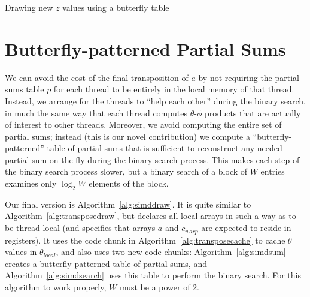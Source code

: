 \documentclass[10pt,nohyperref]{sigplanconf}
\newcommand*\Assign[2]{\State #1 $\gets$ #2}
\newcommand*\LocalArray[1]{\State {\bf local array} #1}
\newcommand*\RegisterArray[1]{\State {\bf register array} #1}
\newcommand*\Bind[2]{\State {\bf let} #1 $\gets$ #2}
\newcommand*\Var[1]{{\mathit{#1}}}
\newcommand*\Output{\;\mathbf{output}\;}
\newcommand*\ProcTwoX[1]{\State\hbox{\hskip-\algorithmicindent\hskip\wd\proctwobox#1$\bigr)$}}
\newcommand*\UseCodeChunk[1]{\State $\langle${#1}$\rangle$}
\begin{document}
\begin{algorithm}[t]
\caption{Drawing new $z$ values using a butterfly table}\label{alg:simddraw}
\end{algorithm}




\section{Butterfly-patterned Partial Sums}


We can avoid the cost of the final transposition of $a$ by not requiring the partial sums table $p$
for each thread to be entirely in the local memory of that thread.  Instead, we arrange for the
threads to ``help each other'' during the binary search, in much the same way that
each thread computes $\theta$-$\phi$ products that are actually of interest to other threads.
Moreover, we avoid computing the entire set of partial sums; instead (this is our novel contribution) we compute a
``butterfly-patterned'' table of partial sums that is sufficient to reconstruct any
needed partial sum on the fly during the binary search process.  This makes each step of
the binary search process slower, but a binary search
of a block of $W$ entries examines only $\log_2 W$ elements of the block.

Our final version is Algorithm~\ref{alg:simddraw}.  It is quite similar to Algorithm~\ref{alg:transposedraw},
but declares all local arrays in such a way as to be thread-local (and specifies that arrays $a$ and $c_{\mathit{warp}}$
are expected to reside in registers).  It uses the code chunk in Algorithm~\ref{alg:transposecache}
to cache $\theta$ values in $\theta_{\mathit{local}}$, and also uses two new code chunks:
Algorithm~\ref{alg:simdsum} creates a butterfly-patterned table of partial sums, and
Algorithm~\ref{alg:simdsearch} uses this table to perform the binary search.
For this algorithm to work properly, $W$ must be a power of 2.
\end{document}
